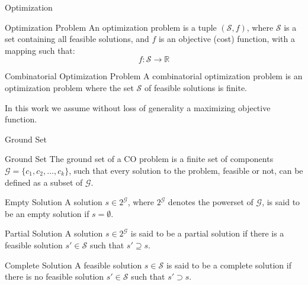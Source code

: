 \begin{frame}{Optimization}

  \begin{block}{Optimization Problem}
    An optimization problem is a tuple $(\mathcal{S}, f)$, where
    $\mathcal{S}$ is a set containing all feasible solutions, and $f$ is an
    objective (cost) function, with a mapping such that:
    \begin{equation*}
      f \colon \mathcal{S} \longrightarrow \mathbb{R}
    \end{equation*}
  \end{block}

  \begin{block}{Combinatorial Optimization Problem}
    A combinatorial optimization problem is an optimization problem where the
    set $\mathcal{S}$ of feasible solutions is finite.
  \end{block}

  In this work we assume without loss of generality a maximizing objective function.
\end{frame}

\begin{frame}{Ground Set}

  \begin{block}{Ground Set}
    The ground set of a CO problem is a finite set of
    components $\mathcal{G} = \{c_1, c_2, \ldots, c_k\}$, such that every solution to the
    problem, feasible or not, can be defined as a subset of $\mathcal{G}$.
  \end{block}

  \begin{block}{Empty Solution}
    A solution $s \in 2^\mathcal{G}$, where $2^\mathcal{G}$ denotes the powerset of $\mathcal{G}$,
    is said to be an empty solution if $s = \emptyset$.
  \end{block}

  \begin{block}{Partial Solution}
    A solution $s \in 2^\mathcal{G}$ is said to be a
    partial solution if there is a feasible solution $s' \in \mathcal{S}$ such
    that $s' \supseteq s$.
  \end{block}

  \begin{block}{Complete Solution}
    A feasible solution $s \in \mathcal{S}$ is said
    to be a complete solution if there is no feasible solution $s' \in
      \mathcal{S}$ such that $s' \supset s$.
  \end{block}
\end{frame}


